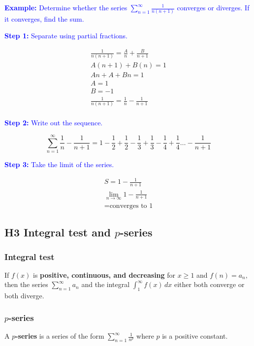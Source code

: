 \documentclass[letterpaper, 12pt]{article}
\newcommand{\example}[1]{\textcolor{blue}{\textbf{Example:} #1}}
\newcommand{\step}[2]{\textcolor{blue}{\textbf{Step #1:} #2}}
\begin{document}
\example{Determine whether the series $\displaystyle \sum_{n=1}^\infty \frac{1}{n(n+1)}$ converges or diverges. If it converges, find the sum.}

\step{1}{Separate using partial fractions.}

\begin{gather*}
\frac{1}{n(n+1)} = \frac{A}{n} + \frac{B}{n+1} \\
A(n+1) + B(n) = 1 \\
An + A + Bn = 1 \\
A = 1 \\
B = -1 \\
\frac{1}{n(n+1)} = \frac{1}{n} - \frac{1}{n+1} \\
\end{gather*}

\step{2}{Write out the sequence.}

$$\sum_{n = 1}^\infty \frac{1}{n} - \frac{1}{n+1} = 1-\frac12+\frac12-\frac13+\frac13-\frac14+\frac14 \dots - \frac{1}{n+1}$$

\step{3}{Take the limit of the series.}

\begin{gather*}
S = 1 - \frac{1}{n+1} \\
\lim_{n \to \infty} 1 - \frac{1}{n+1}\\
= \boxed{\text{converges to 1}}
\end{gather*}

\subsection*{H3 Integral test and $p$-series}

\subsubsection*{Integral test}

If $f(x)$ is \textbf{positive, continuous, and decreasing} for $x \geq 1$ and $f(n) = a_n,$ then the series $\displaystyle \sum_{n=1}^\infty a_n$ and the integral $\displaystyle \int_1^\infty f(x) \, dx$ either both converge or both diverge.

\subsubsection*{$p$-series}

A \textbf{$p$-series} is a series of the form $\displaystyle \sum_{n=1}^\infty \frac{1}{n^p}$ where $p$ is a positive constant.
\end{document}
